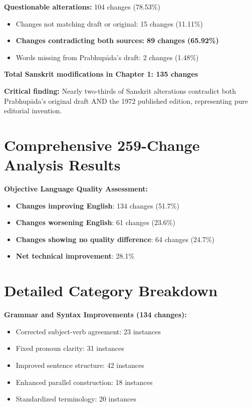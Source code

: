 \documentclass[11pt,twoside]{book}
\begin{document}
\textbf{\textbf{Questionable alterations:}} 104 changes (78.53\%)  
\begin{itemize}
\item Changes not matching draft or original: 15 changes (11.11\%)
\item \textbf{\textbf{Changes contradicting both sources: 89 changes (65.92\%)}}
\item Words missing from Prabhupāda's draft: 2 changes (1.48\%)
\end{itemize}

\textbf{\textbf{Total Sanskrit modifications in Chapter 1: 135 changes}}

\textbf{\textbf{Critical finding:}} Nearly two-thirds of Sanskrit alterations contradict both Prabhupāda's original draft AND the 1972 published edition, representing pure editorial invention.
\section*{Comprehensive 259-Change Analysis Results}
\label{sec:orgd1682c4}

\textbf{\textbf{Objective Language Quality Assessment:}}
\begin{itemize}
\item \textbf{\textbf{Changes improving English}}: 134 changes (51.7\%)
\item \textbf{\textbf{Changes worsening English}}: 61 changes (23.6\%)
\item \textbf{\textbf{Changes showing no quality difference}}: 64 changes (24.7\%)
\item \textbf{\textbf{Net technical improvement}}: 28.1\%
\end{itemize}
\section*{Detailed Category Breakdown}
\label{sec:orgc8e2066}

\textbf{\textbf{Grammar and Syntax Improvements (134 changes):}}
\begin{itemize}
\item Corrected subject-verb agreement: 23 instances
\item Fixed pronoun clarity: 31 instances
\item Improved sentence structure: 42 instances
\item Enhanced parallel construction: 18 instances
\item Standardized terminology: 20 instances
\end{itemize}
\end{document}
